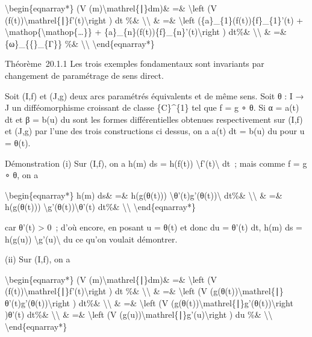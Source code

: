 \documentclass[]{article}
\begin{document}
\textbackslash{}begin\{eqnarray*\} (V
(m)\textbackslash{}mathrel\{∣\}dm)\& =\& \textbackslash{}left (V
(f(t))\textbackslash{}mathrel\{∣\}f'(t)\textbackslash{}right ) dt \%\&
\textbackslash{}\textbackslash{} \& =\& \textbackslash{}left
(\{a\}\_\{1\}(f(t))\{f\}\_\{1\}'(t) +
\textbackslash{}mathop\{\textbackslash{}mathop\{\ldots{}\}\} +
\{a\}\_\{n\}(f(t))\{f\}\_\{n\}'(t)\textbackslash{}right ) dt\%\&
\textbackslash{}\textbackslash{} \& =\& \{ω\}\_\{\{\textbar{}\}\_\{Γ\}\}
\%\& \textbackslash{}\textbackslash{} \textbackslash{}end\{eqnarray*\}

Théorème~20.1.1 Les trois exemples fondamentaux sont invariants par
changement de paramétrage de sens direct.

Soit (I,f) et (J,g) deux arcs paramétrés équivalents et de même sens.
Soit θ : I → J un difféomorphisme croissant de classe \{C\}\^{}\{1\} tel
que f = g ∘ θ. Si α = a(t) dt et β = b(u) du sont les formes
différentielles obtenues respectivement sur (I,f) et (J,g) par l'une des
trois constructions ci dessus, on a a(t) dt = b(u) du pour u = θ(t).

Démonstration (i) Sur (I,f), on a h(m) ds = h(f(t))
\textbackslash{}\textbar{}f'(t)\textbackslash{}\textbar{} dt~; mais
comme f = g ∘ θ, on a

\textbackslash{}begin\{eqnarray*\} h(m) ds\& =\& h(g(θ(t)))
\textbackslash{}\textbar{}θ'(t)g'(θ(t))\textbackslash{}\textbar{} dt\%\&
\textbackslash{}\textbackslash{} \& =\& h(g(θ(t)))
\textbackslash{}\textbar{}g'(θ(t))\textbackslash{}\textbar{}θ'(t) dt\%\&
\textbackslash{}\textbackslash{} \textbackslash{}end\{eqnarray*\}

car θ'(t) \textgreater{} 0~; d'où encore, en posant u = θ(t) et donc du
= θ'(t) dt, h(m) ds = h(g(u))
\textbackslash{}\textbar{}g'(u)\textbackslash{}\textbar{} du ce qu'on
voulait démontrer.

(ii) Sur (I,f), on a

\textbackslash{}begin\{eqnarray*\} (V
(m)\textbackslash{}mathrel\{∣\}dm)\& =\& \textbackslash{}left (V
(f(t))\textbackslash{}mathrel\{∣\}f'(t)\textbackslash{}right ) dt \%\&
\textbackslash{}\textbackslash{} \& =\& \textbackslash{}left (V
(g(θ(t))\textbackslash{}mathrel\{∣\}θ'(t)g'(θ(t))\textbackslash{}right )
dt\%\& \textbackslash{}\textbackslash{} \& =\& \textbackslash{}left (V
(g(θ(t))\textbackslash{}mathrel\{∣\}g'(θ(t))\textbackslash{}right )θ'(t)
dt\%\& \textbackslash{}\textbackslash{} \& =\& \textbackslash{}left (V
(g(u))\textbackslash{}mathrel\{∣\}g'(u)\textbackslash{}right ) du \%\&
\textbackslash{}\textbackslash{} \textbackslash{}end\{eqnarray*\}
\end{document}
